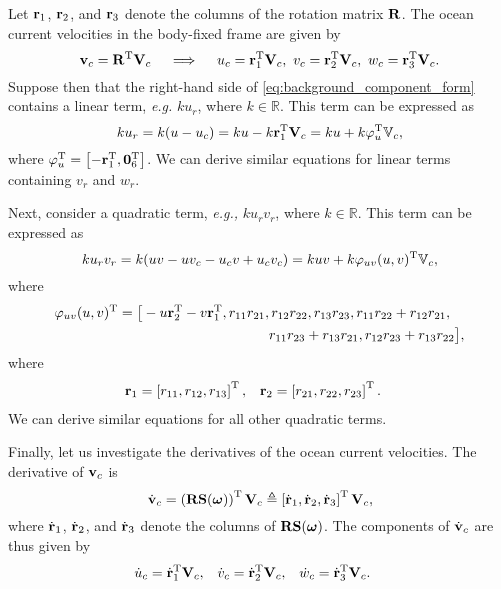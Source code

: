Let $\mathbf{r}_1$, $\mathbf{r}_2$, and $\mathbf{r}_3$ denote the columns of the rotation matrix $\mathbf{R}$.
The ocean current velocities in the body-fixed frame are given by
\begin{equation}
    \mathbf{v}_c = \mathbf{R}^{\mathrm{T}} \mathbf{V}_c \quad \implies \quad
    u_c = \mathbf{r}_1^{\mathrm{T}} \mathbf{V}_c, \,\,
    v_c = \mathbf{r}_2^{\mathrm{T}} \mathbf{V}_c, \,\,
    w_c = \mathbf{r}_3^{\mathrm{T}} \mathbf{V}_c.
\end{equation}
Suppose then that the right-hand side of \eqref{eq:background_component_form} contains a linear term, \emph{e.g.} $k u_r$, where $k \in \mathbb{R}$.
This term can be expressed as
\begin{equation}
    k u_r = k (u - u_c) = k u - k \mathbf{r}_1^{\mathrm{T}} \mathbf{V}_c
    = k u + k \varphi_u^{\mathrm{T}} \mathbb{V}_c,
\end{equation}
where $\varphi_u^{\mathrm{T}} = \left[-\mathbf{r}_1^{\mathrm{T}}, \mathbf{0}_6^{\mathrm{T}}\right]$.
We can derive similar equations for linear terms containing $v_r$ and $w_r$.

Next, consider a quadratic term, \emph{e.g.,} $k u_r v_r$, where $k \in \mathbb{R}$.
This term can be expressed as
\begin{equation}
    k u_r v_r = k (uv - uv_c - u_cv + u_cv_c) = k u v + k \varphi_{uv}(u,v)^{\mathrm{T}} \mathbb{V}_c,
\end{equation}
where
\begin{align}
    \varphi_{uv}(u,v)^{\mathrm{T}} = \big[-u\mathbf{r}_2^{\mathrm{T}}-v\mathbf{r}_1^{\mathrm{T}}, r_{11}r_{21}, &\,r_{12}r_{22}, r_{13}r_{23}, r_{11}r_{22}+r_{12}r_{21}, \\
    &r_{11}r_{23}+r_{13}r_{21}, r_{12}r_{23}+r_{13}r_{22}\big], \nonumber
\end{align}
where
\begin{align}
    \mathbf{r}_1 &= \left[r_{11}, r_{12}, r_{13}\right]^{\mathrm{T}}, &
    \mathbf{r}_2 &= \left[r_{21}, r_{22}, r_{23}\right]^{\mathrm{T}}.
\end{align}
We can derive similar equations for all other quadratic terms.

Finally, let us investigate the derivatives of the ocean current velocities.
The derivative of $\mathbf{v}_c$ is
\begin{equation}
    \dot{\mathbf{v}}_c = \left(\mathbf{R}\mathbf{S}(\bm{\omega})\right)^{\mathrm{T}} \mathbf{V}_c \triangleq \left[\dot{\mathbf{r}}_1, \dot{\mathbf{r}}_2, \dot{\mathbf{r}}_3\right]^{\mathrm{T}} \mathbf{V}_c,
\end{equation}
where $\dot{\mathbf{r}}_1$, $\dot{\mathbf{r}}_2$, and $\dot{\mathbf{r}}_3$ denote the columns of $\mathbf{R}\mathbf{S}(\bm{\omega})$.
The components of $\dot{\mathbf{v}}_c$ are thus given by
\begin{align}
    \dot{u}_c &= \dot{\mathbf{r}}_1^{\mathrm{T}} \mathbf{V}_c, &
    \dot{v}_c &= \dot{\mathbf{r}}_2^{\mathrm{T}} \mathbf{V}_c, &
    \dot{w}_c &= \dot{\mathbf{r}}_3^{\mathrm{T}} \mathbf{V}_c.
\end{align}

